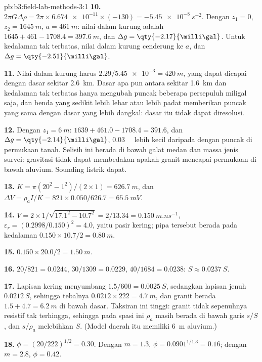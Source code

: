 \begin{solution}{pb:b3:field-lab-methods-3:1}
\textbf{10.} $2\pi G\Delta\rho = 2\pi\times\num{6.674e-11}\times(-130) =
\qty{-5.45e-8}{s^{-2}}$. Dengan $z_1 = 0$, $z_2 = \qty{1645}{m}$, $a =
\qty{461}{m}$: nilai dalam kurung adalah $1645 + 461 - 1708.4 = \qty{397.6}{m}$,
dan $\Delta g = \qty{-2.17}{\milli\gal}$. Untuk kedalaman tak terbatas, nilai
dalam kurung cenderung ke $a$, dan $\Delta g = \qty{-2.51}{\milli\gal}$.

\textbf{11.} Nilai dalam kurung harus $2.29/\num{5.45e-3} = \qty{420}{m}$, yang
dapat dicapai dengan dasar sekitar \qty{2.6}{km}. Dasar apa pun antara sekitar
\qty{1.6}{km} dan kedalaman tak terbatas hanya mengubah puncak beberapa persepuluh
miligal saja, dan benda yang sedikit lebih lebar atau lebih padat memberikan puncak yang sama
dengan dasar yang lebih dangkal: dasar itu tidak dapat diresolusi.

\textbf{12.} Dengan $z_1 = \qty{6}{m}$: $1639 + 461.0 - 1708.4 = 391.6$, dan
$\Delta g = \qty{-2.14}{\milli\gal}$, \qty{0.03}{\milli\gal} lebih kecil daripada
dengan puncak di permukaan tanah. Selisih ini berada di bawah galat medan dan massa jenis
survei: gravitasi tidak dapat membedakan apakah granit mencapai
permukaan di bawah aluvium. Sounding listrik dapat.

\textbf{13.} $K = \pi(20^2 - 1^2)/(2\times1) = \qty{626.7}{m}$, dan $\Delta V =
\rho_a I/K = 821\times0.050/626.7 = \qty{65.5}{mV}$.

\textbf{14.} $V = 2\times1/\sqrt{17.1^2 - 10.7^2} = 2/13.34 =
\qty{0.150}{m.ns^{-1}}$, $\varepsilon_r = (0.2998/0.150)^2 = 4.0$, yaitu
pasir kering; pipa tersebut berada pada kedalaman $0.150\times10.7/2 = \qty{0.80}{m}$.

\textbf{15.} $0.150\times20.0/2 = \qty{1.50}{m}$.

\textbf{16.} $20/821 = \num{0.0244}$, $30/1309 = \num{0.0229}$, $40/1684 =
\num{0.0238}$: $S \approx \qty{0.0237}{S}$.

\textbf{17.} Lapisan kering menyumbang $1.5/600 = \qty{0.0025}{S}$, sedangkan
lapisan jenuh $\qty{0.0212}{S}$, sehingga tebalnya $0.0212\times222 =
\qty{4.7}{m}$, dan granit berada $1.5 + 4.7 = \qty{6.2}{m}$ di bawah
dasar. Taksiran ini tinggi: granit tidak sepenuhnya resistif tak terhingga, sehingga
pada spasi ini $\rho_a$ masih berada di bawah garis
$s/S$, dan $s/\rho_a$ melebihkan $S$. (Model daerah itu memiliki
\qty{6}{m} aluvium.)

\textbf{18.} $\phi = (20/222)^{1/2} = \num{0.30}$. Dengan $m = 1.3$, $\phi =
0.0901^{1/1.3} = \num{0.16}$; dengan $m = 2.8$, $\phi = \num{0.42}$.


\end{solution}
